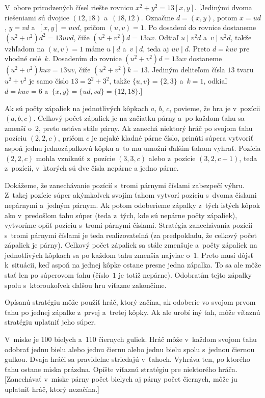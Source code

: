 {V~obore prirodzených čísel riešte rovnicu $x^2+y^2=13[x,y]$.
[Jedinými dvoma riešeniami sú dvojice $(12,18)$ a~$(18,12)$. Označme
$d=(x,y)$, potom $x=ud$, $y=vd$ a~$[x,y]=uvd$, pričom $(u,v)=1$. Po
dosadení do rovnice dostaneme $(u^2+v^2)d^2=13uvd$, čiže
$(u^2+v^2)d=13uv$. Odtiaľ $u\mid v^2d$ a~$v\mid u^2d$, takže
vzhľadom na $(u,v)=1$ máme $u\mid d$ a~$v\mid d$, teda aj
$uv\mid d$. Preto $d=kuv$ pre vhodné celé~$k$. Dosadením do
rovnice $(u^2+v^2)d=13uv$ dostaneme $(u^2+v^2)kuv=13uv$, čiže
$(u^2+v^2)k=13$. Jediným deliteľom čísla $13$ tvaru $u^2+v^2$ je
samo číslo $13=2^2+3^2$, takže $\{u,v\}=\{2,3\}$ a~$k=1$, odkiaľ
$d=kuv=6$ a~$\{x,y\}=\{ud,vd\}=\{12,18\}$.]
}

{%
Ak sú počty zápaliek na jednotlivých kôpkach $a$, $b$, $c$, povieme, že hra je v~pozícii $(a,b,c)$. Celkový počet zápaliek je na začiatku párny a~po každom ťahu sa zmenší o~$2$, preto ostáva stále párny. Ak zanechá niektorý hráč po svojom ťahu pozíciu $(2,2,c)$, pričom $c$ je nejaké kladné párne číslo, prinúti súpera vytvoriť aspoň jednu jednozápalkovú kôpku a~to mu umožní ďalším ťahom vyhrať. Pozícia $(2,2,c)$ mohla vzniknúť z~pozície $(3,3,c)$ alebo z~pozície $(3,2,c+1)$, teda z~pozícií, v~ktorých sú dve čísla nepárne a jedno párne.

Dokážeme, že zanechávanie pozícií s~tromi párnymi číslami zabezpečí výhru. Z~takej pozície súper akýmkoľvek svojím ťahom vytvorí pozíciu s~dvoma číslami nepárnymi a~jedným párnym. Ak potom odoberieme zápalky z~tých istých kôpok ako v~predošlom ťahu súper (teda z~tých, kde sú nepárne počty zápaliek), vytvoríme opäť pozíciu s~tromi párnymi číslami. Stratégia zanechávania pozícií s~tromi párnymi číslami je teda realizovateľná (za predpokladu, že celkový počet zápaliek je párny). Celkový počet zápaliek sa stále zmenšuje a~počty zápaliek na jednotlivých kôpkach sa po každom ťahu zmenšia najviac o~$1$. Preto musí dôjsť k~situácii, keď aspoň na jednej kôpke ostane presne jedna zápalka. To sa ale môže stať len po súperovom ťahu (číslo~$1$ je totiž nepárne). Odobratím tejto zápalky spolu s~ktoroukoľvek ďalšou hru víťazne zakončíme.

Opísanú stratégiu môže použiť hráč, ktorý začína, ak odoberie vo svojom prvom ťahu po jednej zápalke z~prvej a~tretej kôpky. Ak ale urobí iný ťah, môže víťaznú stratégiu uplatniť jeho súper.

V~miske je 100 bielych a~110 čiernych guliek. Hráč môže v~každom svojom ťahu odobrať jednu bielu alebo jednu čiernu alebo jednu bielu spolu s~jednou čiernou guľkou. Dvaja hráči sa pravidelne striedajú v~ťahoch. Vyhráva ten, po ktorého ťahu ostane miska prázdna. Opíšte víťaznú stratégiu pre niektorého hráča. [Zanechávať v~miske párny počet bielych aj párny počet čiernych, môže ju uplatniť hráč, ktorý nezačína.]

}
